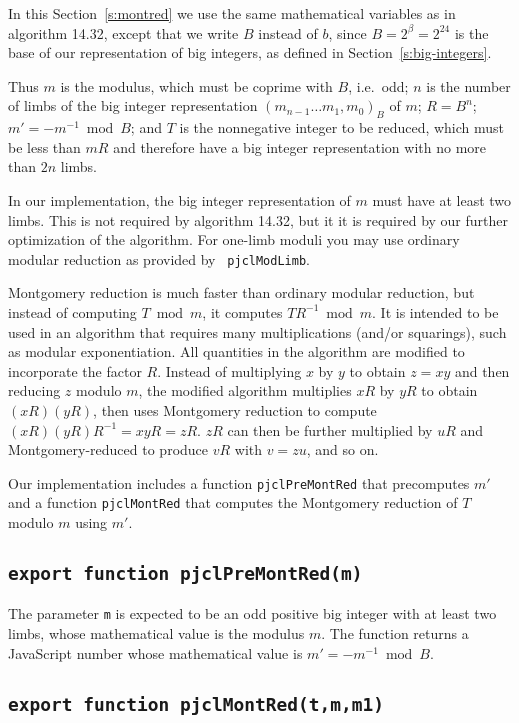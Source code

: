 \documentclass[12pt]{article}
\begin{document}
In this Section~\ref{s:montred} we use the same mathematical variables
as in algorithm 14.32, except that we write $B$ instead of $b$, since $B = 2^\beta = 2^{24}$ is
the base of our representation of big integers, as defined in Section~\ref{s:big-integers}.  

Thus $m$ is the modulus, which must be coprime with $B$, i.e.\ odd;
$n$ is the number of limbs of the big integer representation 
$(m_{n-1} \ldots m_1,m_0)_B$ of $m$;
$R=B^n$;
$m' = -m^{-1} \bmod B$; and $T$ is the nonnegative integer to be reduced, which must be
less than $mR$ and therefore have a big integer representation with no
more than $2n$ limbs.

In our implementation, the big integer representation of $m$ must have
at least two limbs.  This is not required by algorithm 14.32, but it
it is required by our further optimization of the algorithm.  For one-limb
moduli you may use ordinary modular reduction as provided by {\tt
  pjclModLimb}.

Montgomery reduction is much faster than ordinary modular reduction,
but instead of computing $T \bmod m$, it computes $TR^{-1} \bmod m$.
It is intended to be used in an algorithm that requires many
multiplications (and/or squarings), such as modular exponentiation.
All quantities in the algorithm are modified to incorporate the factor
$R$.  Instead of multiplying $x$ by $y$ to obtain $z = xy$ and then
reducing $z$ modulo $m$, the modified algorithm multiplies $xR$ by
$yR$ to obtain $(xR)(yR)$, then uses Montgomery reduction to compute
$(xR)(yR)R^{-1} = xyR = zR$.  $zR$ can then be further multiplied by
$uR$ and Montgomery-reduced to produce $vR$ with $v=zu$, and so on.

Our implementation includes a function {\tt pjclPreMontRed} that
precomputes $m'$ and a function {\tt pjclMontRed} that computes the
Montgomery reduction of $T$ modulo $m$ using $m'$.

\subsection{\tt export function pjclPreMontRed(m)}

The parameter {\tt m} is expected to be an odd positive big integer
with at least two limbs, whose mathematical value is the modulus $m$.
The function returns a JavaScript number whose mathematical value is
$m' = -m^{-1} \bmod B$.

\subsection{\tt export function pjclMontRed(t,m,m1)}
\end{document}
